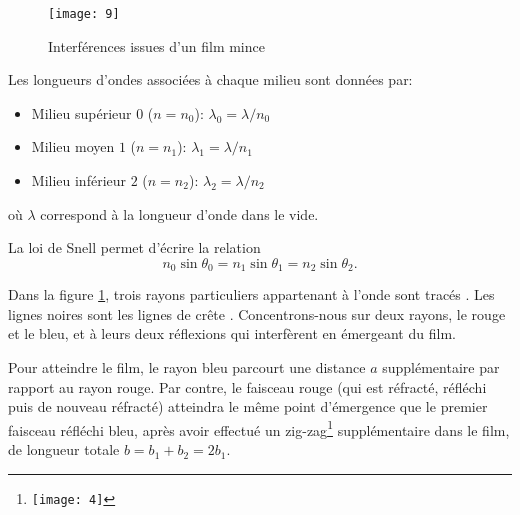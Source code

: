 \begin{figure}[htb]
\centering
\texttt{[image: 9]}
\caption{Interférences issues d'un film mince}
\label{fig:film_mince}
\end{figure}

Les longueurs d'ondes associées à chaque milieu sont données par:
\begin{itemize}
    \item Milieu supérieur $0$ ($n=n_0$): $\lambda_0=\lambda/n_0$
    \item Milieu moyen $1$ ($n=n_1$): $\lambda_1=\lambda/n_1$
    \item Milieu inférieur $2$ ($n=n_2$): $\lambda_2=\lambda/n_2$
\end{itemize}
où $\lambda$ correspond à la longueur d'onde dans le vide.

La loi de Snell permet d'écrire la relation
$$ n_0\sin \theta_0=n_1\sin \theta_1=n_2\sin \theta_2.$$

Dans la figure \ref{fig:film_mince}, trois rayons particuliers appartenant à l'onde sont tracés . Les lignes noires sont les lignes de crête . Concentrons-nous sur deux rayons, le rouge et le bleu, et à leurs deux réflexions qui interfèrent en émergeant du film. 

Pour atteindre le film, le rayon bleu parcourt une distance $a$ supplémentaire par rapport au rayon rouge. Par contre, le faisceau rouge (qui est réfracté, réfléchi puis de nouveau réfracté) atteindra le même point d'émergence que le premier faisceau réfléchi bleu, après avoir effectué un zig-zag\footnote{
\texttt{[image: 4]}} supplémentaire dans le film, de longueur totale $b=b_1+b_2 = 2b_1$. 

